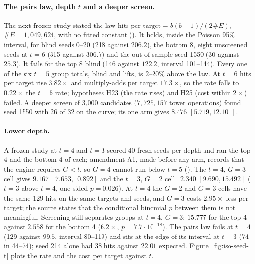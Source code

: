 \paragraph{The pairs law, depth $t$ and a deeper screen.} The next frozen
study stated the law $\text{hits per target}=b(b-1)/(2\#E)$, $\#E=1{,}049{,}624$,
with no fitted constant
(). It holds,
inside the Poisson 95\% interval, for blind seeds 0--20 (218 against
$206.2$), the bottom 8, eight unscreened seeds at $t=6$ (315 against
$306.7$) and the out-of-sample seed 1550 (30 against $25.3$). It fails for
the top 8 blind (146 against $122.2$, interval 101--144). Every one of the
six $t=5$ group totals, blind and lifts, is $2$--$20\%$ above the law. At
$t=6$ hits per target rise $3.82\times$ and multiply-adds per target
$17.3\times$, so the rate falls to $0.22\times$ the $t=5$ rate; hypotheses
H23 (the rate rises) and H25 (cost within $2\times$) failed. A deeper
screen of 3{,}000 candidates ($7{,}725{,}157$ tower operations) found seed
1550 with 26 of 32 on the curve; its one arm gives $8.476$
$[5.719,12.101]$.

\paragraph{Lower depth.} A frozen study at $t=4$ and $t=3$ scored 40
fresh seeds per depth and ran the top 4 and the bottom 4 of each;
amendment A1, made before any arm, records that the engine requires
$G<t$, so $G=4$ cannot run below $t=5$
(). The
$t=4$, $G=3$ cell gives $9.167$ $[7.653,10.892]$ and the $t=3$, $G=2$
cell $12.340$ $[9.690,15.492]$ ($t=3$ above $t=4$, one-sided $p=0.026$).
At $t=4$ the $G=2$ and $G=3$ cells have the same 129 hits on the same
targets and seeds, and $G=3$ costs $2.95\times$ less per target; the
source states that the conditional binomial $p$ between them is not
meaningful. Screening still separates groups at $t=4$, $G=3$: $15.777$
for the top 4 against $2.558$ for the bottom 4 ($6.2\times$,
$p=7.7\cdot10^{-18}$). The pairs law fails at $t=4$ (129 against $99.5$,
interval 80--119) and sits at the edge of its interval at $t=3$ (74 in
44--74); seed 214 alone had 38 hits against $22.01$ expected.
Figure~\ref{fig:iso-seed-t} plots the rate and the cost per target
against $t$.

